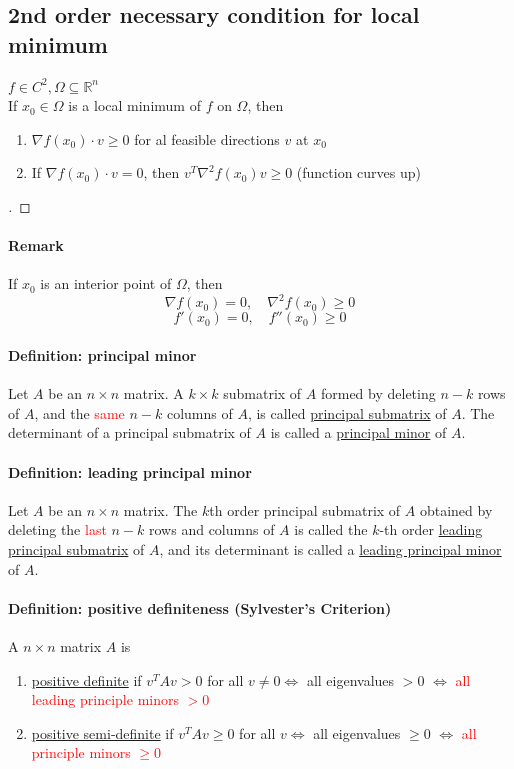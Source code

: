 \documentclass[11pt]{article}
\newcommand{\real}[0]{\mathbb{R}}
\newcommand{\under}[1]{\underline{#1}}
\begin{document}
\subsection{2nd order necessary condition for local minimum}
$f \in C^2, \Omega \subseteq \real^n$ \\
If $x_0 \in \Omega$ is a local minimum of $f$ on $\Omega$, then
\begin{enumerate}
	\item $\nabla f(x_0) \cdot v \geq 0$ for al feasible directions $v$ at $x_0$
	\item If $\nabla f(x_0) \cdot v = 0$, then $v^T \nabla^2 f(x_0) v \geq 0$
	(function curves up)
\end{enumerate}
\begin{proof}
[]
\end{proof}

\paragraph{Remark}
If $x_0$ is an interior point of $\Omega$, then
$$\nabla f(x_0) = 0, \quad \nabla^2 f(x_0)\geq 0$$
$$f'(x_0) = 0, \quad f''(x_0) \geq 0$$

\paragraph{Definition: principal minor}
Let $A$ be an $n \times n$ matrix. A $k \times k$ submatrix of $A$ formed by deleting $n-k$ rows of $A$, and the \textcolor{red}{same} $n - k$ columns of $A$, is called \under{principal submatrix} of $A$. The determinant of a principal submatrix of $A$ is called a \under{principal minor} of $A$.

\paragraph{Definition: leading principal minor}
Let $A$ be an $n \times n$ matrix. The $k$th order principal submatrix of $A$ obtained by deleting the \textcolor{red}{last} $n-k$ rows and columns of $A$ is called the $k$-th order \under{leading principal submatrix} of $A$, and its determinant is called a \under{leading principal minor} of $A$.

\paragraph{Definition: positive definiteness (Sylvester's Criterion)}
A $n \times n$ matrix $A$ is \\
\begin{enumerate}
	\item \under{positive definite} if $v^TAv > 0$ for all $v \neq 0 \iff $ all eigenvalues $>0$ $\iff$ \textcolor{red}{all leading principle minors $> 0$}
	\item \under{positive semi-definite} if $v^TAv \geq 0$ for all $v \iff $ all eigenvalues $\geq 0$ $\iff$ \textcolor{red}{all principle minors $\geq 0$}
\end{enumerate}
\end{document}
